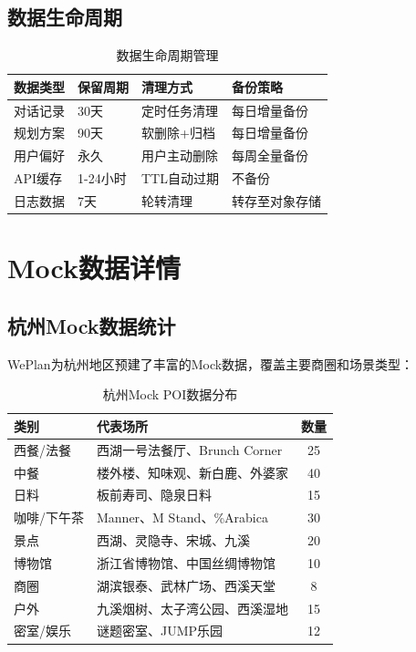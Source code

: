 \documentclass[12pt,a4paper]{ctexart}
\begin{document}
\subsection{数据生命周期}

\begin{table}[H]
\centering
\caption{数据生命周期管理}
\label{tab:data-lifecycle}
\renewcommand{\arraystretch}{1.3}
\begin{tabular}{p{3cm} p{3cm} p{3cm} p{3cm}}
\toprule
\textbf{数据类型} & \textbf{保留周期} & \textbf{清理方式} & \textbf{备份策略} \\
\midrule
对话记录 & 30天 & 定时任务清理 & 每日增量备份 \\
规划方案 & 90天 & 软删除+归档 & 每日增量备份 \\
用户偏好 & 永久 & 用户主动删除 & 每周全量备份 \\
API缓存 & 1-24小时 & TTL自动过期 & 不备份 \\
日志数据 & 7天 & 轮转清理 & 转存至对象存储 \\
\bottomrule
\end{tabular}
\end{table}

\section{Mock数据详情}

\subsection{杭州Mock数据统计}

WePlan为杭州地区预建了丰富的Mock数据，覆盖主要商圈和场景类型：

\begin{table}[H]
\centering
\caption{杭州Mock POI数据分布}
\label{tab:hangzhou-mock}
\renewcommand{\arraystretch}{1.3}
\begin{tabularx}{\textwidth}{lXc}
\toprule
\textbf{类别} & \textbf{代表场所} & \textbf{数量} \\
\midrule
西餐/法餐 & 西湖一号法餐厅、Brunch Corner & 25 \\
中餐 & 楼外楼、知味观、新白鹿、外婆家 & 40 \\
日料 & 板前寿司、隐泉日料 & 15 \\
咖啡/下午茶 & Manner、M Stand、\%Arabica & 30 \\
景点 & 西湖、灵隐寺、宋城、九溪 & 20 \\
博物馆 & 浙江省博物馆、中国丝绸博物馆 & 10 \\
商圈 & 湖滨银泰、武林广场、西溪天堂 & 8 \\
户外 & 九溪烟树、太子湾公园、西溪湿地 & 15 \\
密室/娱乐 & 谜题密室、JUMP乐园 & 12 \\
\bottomrule
\end{tabularx}
\end{table}
\end{document}
